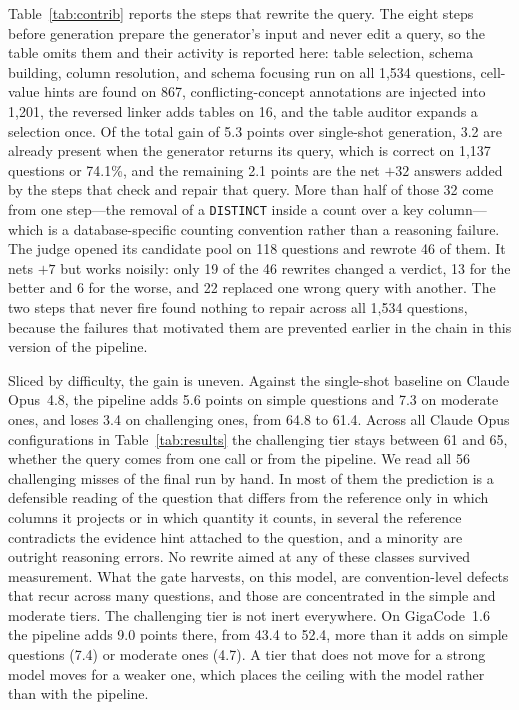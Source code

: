 Table~\ref{tab:contrib} reports the steps that rewrite the query. The eight
steps before generation prepare the generator's input and never edit a query, so the
table omits them and their activity is reported here: table selection, schema
building, column resolution, and schema focusing run on all 1,534 questions,
cell-value hints are found on 867, conflicting-concept annotations are injected
into 1,201, the reversed linker adds tables on 16, and the table auditor
expands a selection once. Of the total gain of 5.3 points over single-shot
generation, 3.2 are already present when the generator returns its query, which
is correct on 1,137 questions or 74.1\%, and the remaining 2.1 points are the
net $+32$ answers added by the steps that check and repair that query. More
than half of those 32 come from one step---the removal of a \texttt{DISTINCT}
inside a count over a key column---which is a database-specific counting
convention rather than a reasoning failure. The judge opened its candidate
pool on 118 questions and rewrote 46 of them. It nets $+7$ but works noisily:
only 19 of the 46 rewrites changed a verdict, 13 for the better and 6 for the
worse, and 22 replaced one wrong query with another. The two steps that never fire found nothing to repair
across all 1,534 questions, because the failures that motivated them are
prevented earlier in the chain in this version of the pipeline.

Sliced by difficulty, the gain is uneven. Against the
single-shot baseline on Claude Opus~4.8, the pipeline adds 5.6 points on simple
questions and 7.3 on moderate ones, and loses 3.4 on challenging ones, from
64.8 to 61.4. Across all Claude Opus configurations in
Table~\ref{tab:results} the challenging tier stays between 61 and 65, whether
the query comes from one call or from the pipeline. We read all 56 challenging
misses of the final run by hand. In most of them the prediction is a
defensible reading of the question that differs from the reference only in
which columns it projects or in which quantity it counts, in several the
reference contradicts the evidence hint attached to the question, and a
minority are outright reasoning errors. No rewrite aimed at any of these
classes survived measurement. What the gate harvests, on this model, are
convention-level defects that recur across many questions, and those are
concentrated in the simple and moderate tiers. The challenging tier is not
inert everywhere. On GigaCode~1.6 the pipeline adds 9.0 points there, from 43.4
to 52.4, more than it adds on simple questions (7.4) or moderate ones (4.7). A
tier that does not move for a strong model moves for a weaker one, which places
the ceiling with the model rather than with the pipeline.

